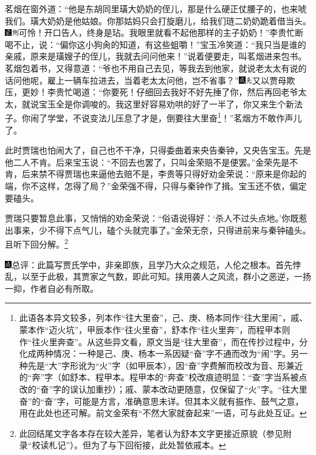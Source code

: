 茗烟在窗外道：“他是东胡同里璜大奶奶的侄儿，那是什么硬正仗腰子的，也来唬我们。璜大奶奶是他姑娘。你那姑妈只会打旋磨儿，给我们琏二奶奶跪着借当头。{\includegraphics[width=3mm]{../Images/00006}\includegraphics[width=3mm]{../Images/00011}\footnotesize \kaishu 可怜！开口告人，终身是玷。}我眼里就看不起他那样的主子奶奶！”李贵忙断喝不止，说：“偏你这小狗肏的知道，有这些蛆嚼！”宝玉冷笑道：“我只当是谁的亲戚，原来是璜嫂子的侄儿，我就去问问他来！”说着便要走，叫茗烟进来包书。茗烟包着书，又得意道：“爷也不用自己去见，等我去到他家，就说老太太有说的话问他呢，雇上一辆车拉进去，当着老太太问他，岂不省事？”{\includegraphics[width=3mm]{../Images/00005}\includegraphics[width=3mm]{../Images/00012}\footnotesize \kaishu 又以贾母欺压，更妙！}李贵忙喝道：“你要死！仔细回去我好不好先捶了你，然后再回老爷太太，就说宝玉全是你调唆的。我这里好容易劝哄的好了一半了，你又来生个新法子。你闹了学堂，不说变法儿压息了才是，倒要往大里奋\footnote{此语各本异文较多，列本作“往大里奋”，己、庚、杨本同作“往大里闹”，戚、蒙本作“迈火坑”，甲辰本作“往火里奋”，舒本作“往火里奔”，而程甲本则作“往火里奔查”。从这些异文看，原文当是“往大里奋”，而在传抄过程中，分化成两种情况：一种是己、庚、杨本一系因疑“奋”字不通而改为“闹”字。另一种先是“大”字形讹为“火”字（如甲辰本），因“奋”字费解而校改为音、形兼近的“奔”字（如舒本、程甲本。程甲本的“奔查”校改痕迹明显：“查”字当系被点改的“奋”字的误认加重抄）；戚、蒙本改动更随意，仅保留了“火”字。“往大里奋”的“奋”字，可能是方言，准确意思未详。但其本义就有振作、鼓气之意，用在此处也还可解。前文金荣有“不然大家就奋起来”一语，可与此处互证。}！”茗烟方不敢作声儿了。

此时贾瑞也怕闹大了，自己也不干净，只得委曲着来央告秦钟，又央告宝玉。先是他二人不肯。后来宝玉说：“不回去也罢了，只叫金荣赔不是便罢。”金荣先是不肯，后来禁不得贾瑞也来逼他去赔不是，李贵等只得好劝金荣说：“原来是你起的端，你不这样，怎得了局？”金荣强不得，只得与秦钟作了揖。宝玉还不依，偏定要磕头。

贾瑞只要暂息此事，又悄悄的劝金荣说：“俗语说得好：‘杀人不过头点地。’你既惹出事来，少不得下点气儿，磕个头就完事了。”金荣无奈，只得进前来与秦钟磕头。且听下回分解。\footnote{此回结尾文字各本存在较大差异，笔者认为舒本文字更接近原貌（参见附录“校读札记”）。但为了与下回衔接，此处暂依戚本。}

{\includegraphics[width=3mm]{../Images/00005}\kaishu 总评：此篇写贾氏学中，非亲即族，且学乃大众之规范，人伦之根本。首先悖乱，以至于此极，其贾家之气数，即此可知。挟用袭人之风流，群小之恶逆，一扬一抑，作者自必有所取。}